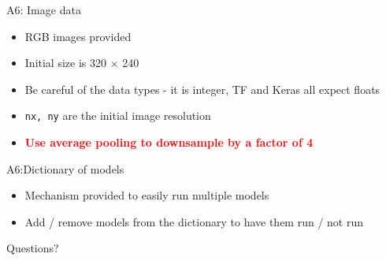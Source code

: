 \documentclass[aspectratio=169]{beamer}
\begin{document}
\begin{frame}[fragile]{A6: Image data}

\begin{itemize}
\item RGB images provided
\item Initial size is 320 $\times$ 240
\item Be careful of the data types - it is integer, TF and Keras all expect floats
\item \texttt{nx, ny} are the initial image resolution
\item {\textcolor{red}{\textbf{Use average pooling to downsample by a factor of 4}}}
\end{itemize}
\end{frame}
\begin{frame}[fragile]{A6:Dictionary of models}

\begin{itemize}
\item Mechanism provided to easily run multiple models
\item Add / remove models from the dictionary to have them run / not run
\end{itemize}
\end{frame}
\begin{frame}{Questions?}
\end{frame}
\end{document}
